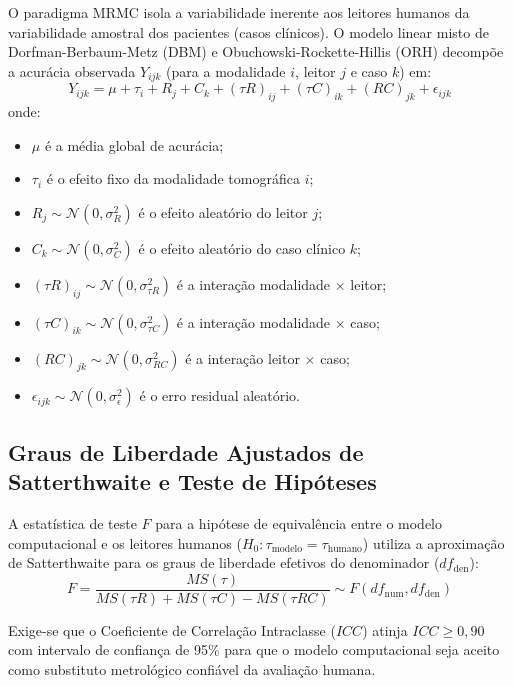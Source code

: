 O paradigma MRMC isola a variabilidade inerente aos leitores humanos da variabilidade amostral dos pacientes (casos clínicos). O modelo linear misto de Dorfman-Berbaum-Metz (DBM) e Obuchowski-Rockette-Hillis (ORH) decompõe a acurácia observada $Y_{ijk}$ (para a modalidade $i$, leitor $j$ e caso $k$) em:
\begin{equation}
  Y_{ijk} = \mu + \tau_i + R_j + C_k + (\tau R)_{ij} + (\tau C)_{ik} + (RC)_{jk} + \epsilon_{ijk}
  \label{eq:mrmc_anova}
\end{equation}
onde:
\begin{itemize}
  \item $\mu$ é a média global de acurácia;
  \item $\tau_i$ é o efeito fixo da modalidade tomográfica $i$;
  \item $R_j \sim \mathcal{N}(0, \sigma^2_R)$ é o efeito aleatório do leitor $j$;
  \item $C_k \sim \mathcal{N}(0, \sigma^2_C)$ é o efeito aleatório do caso clínico $k$;
  \item $(\tau R)_{ij} \sim \mathcal{N}(0, \sigma^2_{\tau R})$ é a interação modalidade $\times$ leitor;
  \item $(\tau C)_{ik} \sim \mathcal{N}(0, \sigma^2_{\tau C})$ é a interação modalidade $\times$ caso;
  \item $(RC)_{jk} \sim \mathcal{N}(0, \sigma^2_{RC})$ é a interação leitor $\times$ caso;
  \item $\epsilon_{ijk} \sim \mathcal{N}(0, \sigma^2_{\epsilon})$ é o erro residual aleatório.
\end{itemize}

\subsection{Graus de Liberdade Ajustados de Satterthwaite e Teste de Hipóteses}
A estatística de teste $F$ para a hipótese de equivalência entre o modelo computacional e os leitores humanos ($H_0: \tau_{\text{modelo}} = \tau_{\text{humano}}$) utiliza a aproximação de Satterthwaite para os graus de liberdade efetivos do denominador ($df_{\text{den}}$):
\begin{equation}
  F = \frac{MS(\tau)}{MS(\tau R) + MS(\tau C) - MS(\tau RC)} \sim F(df_{\text{num}}, df_{\text{den}})
  \label{eq:satterthwaite}
\end{equation}

Exige-se que o Coeficiente de Correlação Intraclasse ($ICC$) atinja $ICC \ge 0{,}90$ com intervalo de confiança de 95\% para que o modelo computacional seja aceito como substituto metrológico confiável da avaliação humana.
